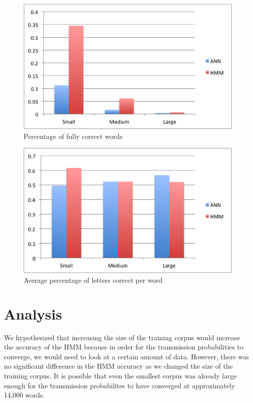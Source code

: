 \documentclass[11pt,a4paper,twocolumn]{article}
\begin{document}
\begin{figure}[h]
\centering
\caption{Percentage of fully correct words}
\includegraphics[scale=0.55]{img/wordsCorrect.png}
\end{figure}

\begin{figure}[h]
\centering
\caption{Average percentage of letters correct per word}
\includegraphics[scale=0.55]{img/wordCorrectness.png}
\end{figure}


\section{Analysis}

We hypothesized that increasing the size of the training corpus would increase the accuracy of the
HMM because in order for the transmission probabilities to converge, we would need to look at a
certain amount of data. However, there was no significant difference in the HMM accuracy as we
changed the size of the training corpus. It is possible that even the smallest corpus was already
large enough for the transmission probabilites to have converged at approximately 14,000 words.
\end{document}
